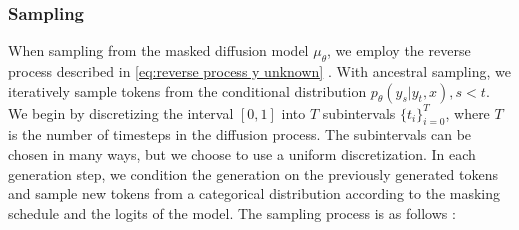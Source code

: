 \subsubsection{Sampling}
\label{sec:sampling}

When sampling from the masked diffusion model $\mu_\theta$, we employ the reverse process described in \eqref{eq:reverse process y unknown} \cite{shi2025simplifiedgeneralizedmaskeddiffusion}. With ancestral sampling, we iteratively sample tokens from the conditional distribution $p_\theta(y_s | y_t, x), s < t $. We begin by discretizing the interval $[0, 1]$ into $T$ subintervals $\{ t_i \}_{i=0}^T$, where $T$ is the number of timesteps in the diffusion process. The subintervals can be chosen in many ways, but we choose to use a uniform discretization. In each generation step, we condition the generation on the previously generated tokens and sample new tokens from a categorical distribution according to the masking schedule and the logits of the model. The sampling process is as follows \cite{shi2025simplifiedgeneralizedmaskeddiffusion}:


\begin{algorithm}[H]
    \caption{Sampling for masked diffusion models}
    \label{alg:ancestral sampling}
\end{algorithm}

